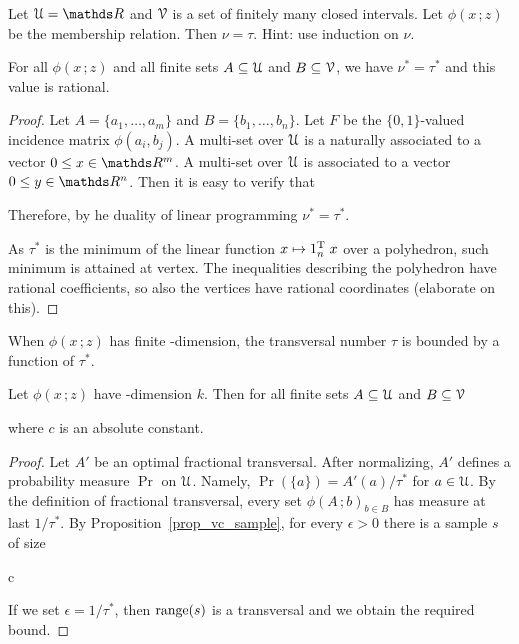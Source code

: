 \documentclass[scombinatorics.tex]{subfiles}
\begin{document}
\begin{exercise}
Let $\U=\RR$ and $\EuScript V$ is a set of finitely many closed intervals.
Let $\phi(x\,;z)$ be the membership relation.
Then $\nu=\tau$.
Hint: use induction on $\nu$.\QED
\end{exercise}

\begin{theorem}\label{thm_fractional_nu=tau}
 For all $\phi(x\,;z)$ and all finite sets $A\subseteq\EuScript U$ and $B\subseteq\EuScript V$, we have $\nu^*=\tau^*$ and this value is rational.
\end{theorem}
\begin{proof}
Let $A=\{a_1,\dots,a_m\}$ and $B=\{b_1,\dots,b_n\}$.
Let $F$ be the $\{0,1\}$-valued incidence matrix $\phi(a_i,b_j)$.
A multi-set over $\EuScript U$ is a naturally associated to a vector $0\le x\in\RR^m$.
A multi-set over $\EuScript U$ is associated to a vector $0\le y\in\RR^n$.
Then it is easy to verify that



Therefore, by he duality of linear programming $\nu^*=\tau^*$.

As $\tau^*$ is the minimum of the linear function $x\mapsto 1_n^{\rm T}\;x$ over a polyhedron, such minimum is attained at vertex.
The inequalities describing the polyhedron have rational coefficients, so also the vertices have rational coordinates (elaborate on this).
\end{proof}

When $\phi(x\,;z)$ has finite \vc-dimension, the transversal number $\tau$ is bounded by a function of $\tau^*$. 

\begin{proposition}\label{prop_bound_fractional_trans}
  Let $\phi(x\,;z)$ have \vc-dimension $k$.
  Then for all finite sets $A\subseteq\EuScript U$ and $B\subseteq\EuScript V$
  
  
  where $c$ is an absolute constant.
\end{proposition}
  
\begin{proof}
  Let $A'$ be an optimal fractional transversal.
  After normalizing, $A'$ defines a probability measure $\Pr$ on $\EuScript U$.
  Namely, $\Pr(\{a\})=A'(a)/\tau^*$ for $a\in\EuScript U$.
  By the definition of fractional transversal, every set $\phi(A\,;b)_{b\in B}$ has measure at last $1/\tau^*$.
  By Proposition~\ref{prop_vc_sample}, for every $\epsilon>0$ there is a sample $s$ of size
  
  {\le}
  {c\,\log{}}

  If we set $\epsilon=1/\tau^*$, then $\mathop{\rm range}(s)$ is a transversal and we obtain the required bound.
\end{proof}
\end{document}
